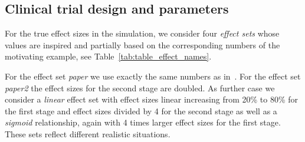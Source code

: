 \documentclass[bimj,fleqn]{w-art}
\theoremstyle{plain}
\theoremstyle{definition}
\begin{document}
\subsection{Clinical trial design and parameters}
\label{subsec:design}
For the true effect sizes in the simulation, we consider four \emph{effect sets} whose values are inspired and partially based on the corresponding numbers of the motivating example, see Table~\ref{tab:table_effect_names}.

For the effect set \emph{paper} we use exactly the same numbers as in~\citet{friede_adaptive_2020}.
For the effect set \emph{paper2} the effect sizes for the second stage are doubled.
As further case we consider a \emph{linear} effect set with effect sizes linear increasing from 20\% to 80\% for the first stage and effect sizes divided by 4 for the second stage as well as a \emph{sigmoid} relationship, again with 4 times larger effect sizes for the first stage.
These sets reflect different realistic situations.
\end{document}
